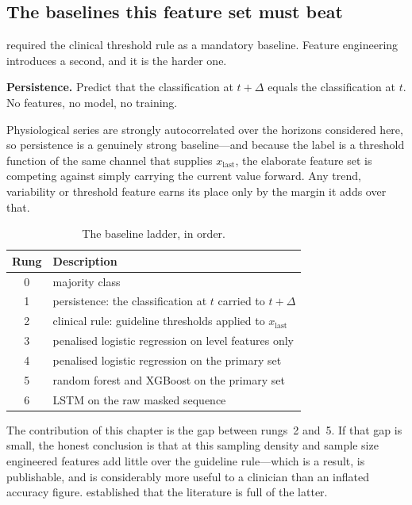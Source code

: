 \documentclass[12pt,a4paper,oneside]{report}
\begin{document}
\subsection{The baselines this feature set must beat}\label{sec:baselines}

 required the clinical threshold rule as a mandatory baseline. Feature engineering introduces a second, and it is the harder one.

\textbf{Persistence.} Predict that the classification at $t+\Delta$ equals the classification at $t$. No features, no model, no training.

Physiological series are strongly autocorrelated over the horizons considered here, so persistence is a genuinely strong baseline---and because the label is a threshold function of the same channel that supplies $x_{\text{last}}$, the elaborate feature set is competing against simply carrying the current value forward. Any trend, variability or threshold feature earns its place only by the margin it adds over that.

\begin{table}[htbp]
\centering\small
\caption{The baseline ladder, in order.}\label{tab:baselines}
\begin{tabularx}{\textwidth}{@{}c X@{}}
\toprule
\textbf{Rung} & \textbf{Description} \\
\midrule
0 & majority class \\
1 & persistence: the classification at $t$ carried to $t+\Delta$ \\
2 & clinical rule: guideline thresholds applied to $x_{\text{last}}$ \\
3 & penalised logistic regression on level features only \\
4 & penalised logistic regression on the primary set \\
5 & random forest and XGBoost on the primary set \\
6 & LSTM on the raw masked sequence \\
\bottomrule
\end{tabularx}
\end{table}

The contribution of this chapter is the gap between rungs~2 and~5. If that gap is small, the honest conclusion is that at this sampling density and sample size engineered features add little over the guideline rule---which is a result, is publishable, and is considerably more useful to a clinician than an inflated accuracy figure.  established that the literature is full of the latter.
\end{document}
